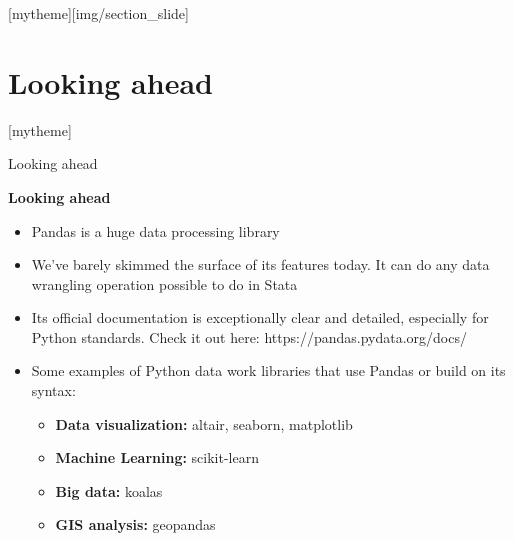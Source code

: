 \documentclass[aspectratio=169]{beamer}
\newcommand{\sectionpic}[2]{
	\setbeamertemplate{section page}[mytheme][#2]
	\section{#1}
	\setbeamertemplate{section page}[mytheme]
}
\begin{document}
\sectionpic{Looking ahead}{img/section_slide}

\begin{frame}{Looking ahead}

	\textbf{Looking ahead}

	\begin{itemize}
		\item Pandas is a huge data processing library
		\item We've barely skimmed the surface of its features today. It can do any data wrangling operation possible to do in Stata
		\item Its official documentation is exceptionally clear and detailed, especially for Python standards. Check it out here: https://pandas.pydata.org/docs/
		\item Some examples of Python data work libraries that use Pandas or build on its syntax:
		\begin{itemize}
			\item \textbf{Data visualization:} altair, seaborn, matplotlib
			\item \textbf{Machine Learning:} scikit-learn
			\item \textbf{Big data:} koalas
			\item \textbf{GIS analysis:} geopandas
		\end{itemize}
	\end{itemize}

\end{frame}
\end{document}
